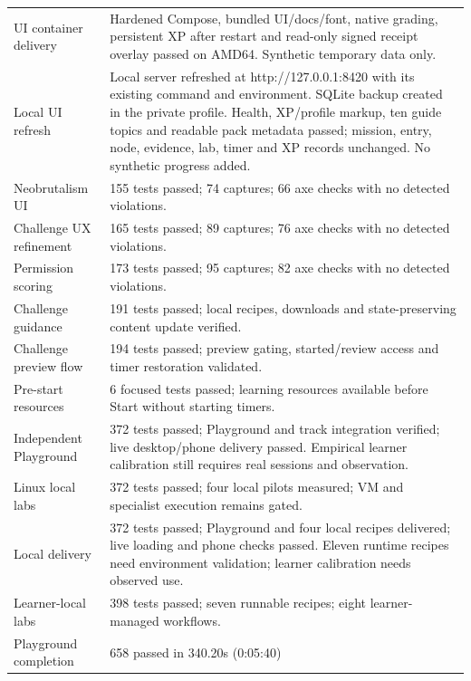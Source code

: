 \begin{longtable}{p{}p{}}
UI container delivery & Hardened Compose, bundled UI/docs/font, native grading, persistent XP after restart and read-only signed receipt overlay passed on AMD64. Synthetic temporary data only. \\
Local UI refresh & Local server refreshed at http://127.0.0.1:8420 with its existing command and environment. SQLite backup created in the private profile. Health, XP/profile markup, ten guide topics and readable pack metadata passed; mission, entry, node, evidence, lab, timer and XP records unchanged. No synthetic progress added. \\
Neobrutalism UI & 155 tests passed; 74 captures; 66 axe checks with no detected violations. \\
Challenge UX refinement & 165 tests passed; 89 captures; 76 axe checks with no detected violations. \\
Permission scoring & 173 tests passed; 95 captures; 82 axe checks with no detected violations. \\
Challenge guidance & 191 tests passed; local recipes, downloads and state-preserving content update verified. \\
Challenge preview flow & 194 tests passed; preview gating, started/review access and timer restoration validated. \\
Pre-start resources & 6 focused tests passed; learning resources available before Start without starting timers. \\
Independent Playground & 372 tests passed; Playground and track integration verified; live desktop/phone delivery passed. Empirical learner calibration still requires real sessions and observation. \\
Linux local labs & 372 tests passed; four local pilots measured; VM and specialist execution remains gated. \\
Local delivery & 372 tests passed; Playground and four local recipes delivered; live loading and phone checks passed. Eleven runtime recipes need environment validation; learner calibration needs observed use. \\
Learner-local labs & 398 tests passed; seven runnable recipes; eight learner-managed workflows. \\
Playground completion & 658 passed in 340.20s (0:05:40) \\
\end{longtable}
